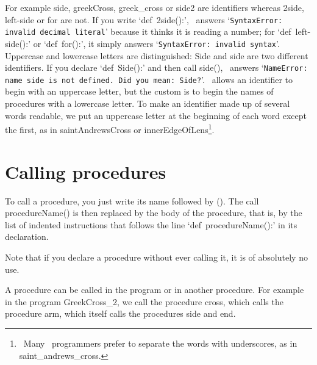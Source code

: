 For example {\idt side}, {\idt greekCross}, {\idt greek\_cross} or {\idt side2} are
identifiers whereas {\idt 2side}, {\idt left-side} or {\idt for} are not.
If you write `{\mcl def}\ {\idt 2side():}', \python\ answers
`{\tt SyntaxError: invalid decimal literal}' because it thinks it is
reading a number; for `{\mcl def}\ {\idt left-side():}' or `{\mcl def}\ {\idt for():}', it
simply answers `{\tt SyntaxError: invalid syntax}'.
Uppercase and lowercase letters are distinguished: {\idt Side} and {\idt side} are two
different identifiers. If you declare `{\mcl def}\ {\idt Side():}' and then
call {\idt side()}, \python\ answers
`{\tt NameError: name \textquotesingle{}side\textquotesingle{} is not defined. Did you mean: \textquotesingle{}Side\textquotesingle{}?}'.
\python\ allows an identifier to begin with an uppercase letter, but the custom is to
begin the names of procedures with a lowercase letter. To make
an identifier made up of several words readable, we
put an uppercase letter at the beginning of each word except the first, as in
{\idt saintAndrewsCross} or {\idt innerEdgeOfLens}\footnote{\ Many \python\
programmers prefer to separate the words with underscores, as in {\idt saint\_andrews\_cross}.}.

\section{Calling procedures}

To call a procedure, you just write its name followed
by {\idt ()}. The call {\idt procedureName()}
is then replaced by the body of the procedure, that is, by the list
of indented instructions that follows the line `{\mcl def}\ {\idt procedureName():}' in its declaration.

Note that if you declare a procedure without ever calling it, it
is of absolutely no use.

A procedure can be called in the program or in another procedure.
For example in the program {\idt GreekCross\_2}, we call
the procedure {\idt cross}, which calls the procedure {\idt arm}, which itself
calls the procedures {\idt side} and {\idt end}.

